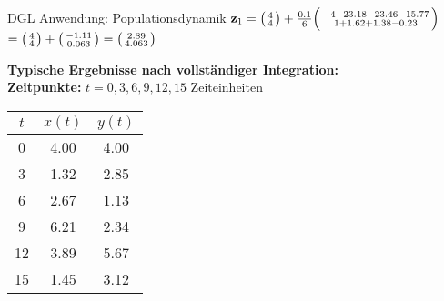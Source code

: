 \begin{example2}{DGL Anwendung: Populationsdynamik}
$\mathbf{z}_1 = \begin{psmallmatrix} 4 \\ 4 \end{psmallmatrix} + \frac{0.1}{6}\begin{psmallmatrix} -4 - 23.18 - 23.46 - 15.77 \\ 1 + 1.62 + 1.38 - 0.23 \end{psmallmatrix}$
$= \begin{psmallmatrix} 4 \\ 4 \end{psmallmatrix} + \begin{psmallmatrix} -1.11 \\ 0.063 \end{psmallmatrix} = \begin{psmallmatrix} 2.89 \\ 4.063 \end{psmallmatrix}$
\vspace{2mm}\\
\begin{minipage}{0.5\linewidth}
\textbf{Typische Ergebnisse nach vollständiger Integration:}
\vspace{1mm}\\
\textbf{Zeitpunkte:} $t = 0, 3, 6, 9, 12, 15$ Zeiteinheiten
\end{minipage}
\begin{minipage}{0.5\linewidth}
\begin{center}
\begin{tabular}{|c|c|c|}
\hline
$t$ & $x(t)$ & $y(t)$ \\
\hline
0 & 4.00 & 4.00 \\
3 & 1.32 & 2.85 \\
6 & 2.67 & 1.13 \\
9 & 6.21 & 2.34 \\
12 & 3.89 & 5.67 \\
15 & 1.45 & 3.12 \\
\hline
\end{tabular}
\end{center}
\end{minipage}


\end{example2}
